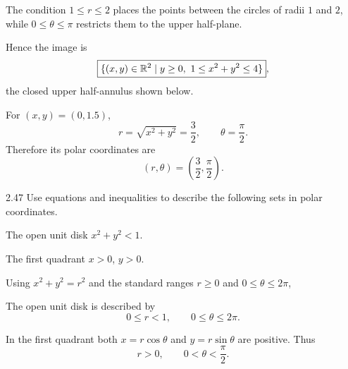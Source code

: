 \documentclass[11pt,oneside]{article}
\begin{document}
\begin{solution}
The condition $1\leq r\leq2$ places the points between the circles of radii $1$ and $2$, while $0\leq\theta\leq\pi$ restricts them to the upper half-plane.

Hence the image is
\[
    \boxed{\{(x,y)\in\mathbb{R}^2\mid y\geq0,\ 1\leq x^2+y^2\leq4\}},
\]
the closed upper half-annulus shown below.

\begin{center}
\end{center}

For $(x,y)=(0,1.5)$,
\[
    r=\sqrt{x^2+y^2}=\frac32,
    \qquad
    \theta=\frac\pi2.
\]
Therefore its polar coordinates are
\[
    \boxed{\left(r,\theta\right)=\left(\frac32,\frac\pi2\right)}.
\]
\end{solution}

\begin{problem}{2.47}
Use equations and inequalities to describe the following sets in polar coordinates.
\begin{problemsubparts}
    \item The open unit disk $x^2+y^2<1$.
    \item The first quadrant $x>0$, $y>0$.
\end{problemsubparts}
\end{problem}

\begin{solution}
Using $x^2+y^2=r^2$ and the standard ranges $r\geq0$ and $0\leq\theta\leq2\pi$,
\begin{problemsubparts}
    \item The open unit disk is described by
    \[
        \boxed{0\leq r<1,\qquad 0\leq\theta\leq2\pi}.
    \]

    \item In the first quadrant both $x=r\cos\theta$ and $y=r\sin\theta$ are positive. Thus
    \[
        \boxed{r>0,\qquad 0<\theta<\frac\pi2}.
    \]
\end{problemsubparts}
\end{solution}
\end{document}
